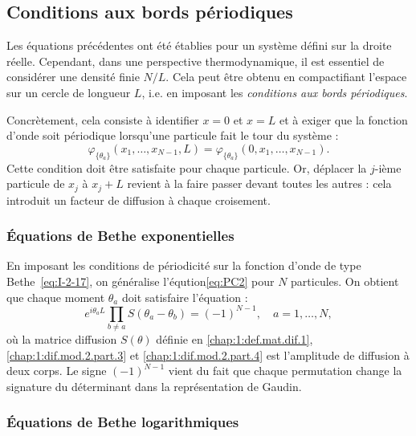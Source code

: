 \vspace{1em}

\subsection{Conditions aux bords périodiques}

Les équations précédentes ont été établies pour un système défini sur la droite réelle. Cependant, dans une perspective thermodynamique, il est essentiel de considérer une densité finie $ N/L$. Cela peut être obtenu en compactifiant l’espace sur un cercle de longueur $L$, i.e. en imposant les {\em conditions aux bords périodiques}.

Concrètement, cela consiste à identifier $x = 0$ et $x = L$ et à exiger que la fonction d’onde soit périodique lorsqu’une particule fait le tour du système :
\begin{equation}\label{eq:periodic}
\varphi_{\{\theta_a\}}(x_1, \dots, x_{N-1}, L) = \varphi_{\{\theta_a\}}(0, x_1, \dots, x_{N-1}).
\end{equation}
Cette condition doit être satisfaite pour chaque particule. Or, déplacer la $j$-ième particule de $x_j$ à $x_j + L$ revient à la faire passer devant toutes les autres : cela introduit un facteur de diffusion à chaque croisement.


\subsubsection{Équations de Bethe exponentielles}

En imposant les conditions de périodicité sur la fonction d’onde de type Bethe~\eqref{eq:I-2-17}, on généralise l'éqution\eqref{eq:PC2} pour $N$ particules. On obtient que chaque moment $\theta_a$ doit satisfaire l’équation :
\begin{equation}
	e^{i \theta_a L} \prod_{b \ne a} S(\theta_a - \theta_b) = (-1)^{N-1}, \quad a = 1, \dots, N,
	\label{eq:bethe_exp}
\end{equation}
où la matrice diffusion $S(\theta)$ définie en \eqref{chap:1:def.mat.dif.1}, \eqref{chap:1:dif.mod.2.part.3} et \eqref{chap:1:dif.mod.2.part.4} est l’amplitude de diffusion à deux corps. Le signe $(-1)^{N-1}$ vient du fait que chaque permutation change la signature du déterminant dans la représentation de Gaudin.

\subsubsection{Équations de Bethe logarithmiques}

